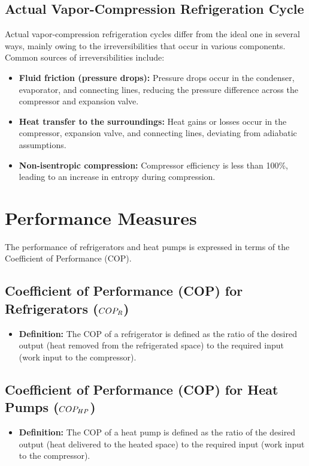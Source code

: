 \subsection{Actual Vapor-Compression Refrigeration Cycle}
Actual vapor-compression refrigeration cycles differ from the ideal one in several ways, mainly owing to the irreversibilities that occur in various components. Common sources of irreversibilities include:
\begin{itemize}
    \item \textbf{Fluid friction (pressure drops):} Pressure drops occur in the condenser, evaporator, and connecting lines, reducing the pressure difference across the compressor and expansion valve.
    \item \textbf{Heat transfer to the surroundings:} Heat gains or losses occur in the compressor, expansion valve, and connecting lines, deviating from adiabatic assumptions.
    \item \textbf{Non-isentropic compression:} Compressor efficiency is less than 100\%, leading to an increase in entropy during compression.
\end{itemize}

\section{Performance Measures}

The performance of refrigerators and heat pumps is expressed in terms of the Coefficient of Performance (COP).

\subsection{Coefficient of Performance (COP) for Refrigerators ($COP_R$)}
\begin{itemize}
    \item \textbf{Definition:} The COP of a refrigerator is defined as the ratio of the desired output (heat removed from the refrigerated space) to the required input (work input to the compressor).
\end{itemize}

\subsection{Coefficient of Performance (COP) for Heat Pumps ($COP_{HP}$)}
\begin{itemize}
    \item \textbf{Definition:} The COP of a heat pump is defined as the ratio of the desired output (heat delivered to the heated space) to the required input (work input to the compressor).
\end{itemize}

